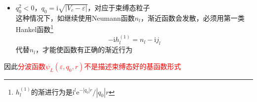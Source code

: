 {\begin{enumerate}
\begin{itemize}
						\begin{displaymath}
							\psi_l(\varepsilon,q_0,r)\sim-\dfrac{\sin(q_0r+\eta_l-l\pi/2)}{r\sin(\eta_l)}
						\end{displaymath}
						表明$r\rightarrow\infty$，波函数是经\textrm{MT}球散射的球函数分波，散射相移为$\eta_l$
					\item $q_0^2<0$，$q_0=\mathrm{i}\sqrt{|V_c-\varepsilon|}$，对应于束缚态粒子\\
						这种情况下，如继续使用\textrm{Neumann}函数$n_l$，渐近函数会发散，必须用第一类\textrm{Hankel}函数\footnote{\tiny $h_l^{(1)}$的渐进行为是$\mathrm{i}^l\mathrm{e}^{-|q_0|r}/|q_0|r$}
						\begin{displaymath}
							-\mathrm{i}h_l^{(1)}=n_l-\mathrm{i}j_l
						\end{displaymath}
代替$n_l$，才能使函数有正确的渐近行为
				\end{itemize}

				因此\textcolor{red}{分波函数$\psi_L(\varepsilon,q_0,r)$不是描述束缚态好的基函数形式}
		\end{enumerate}
}

